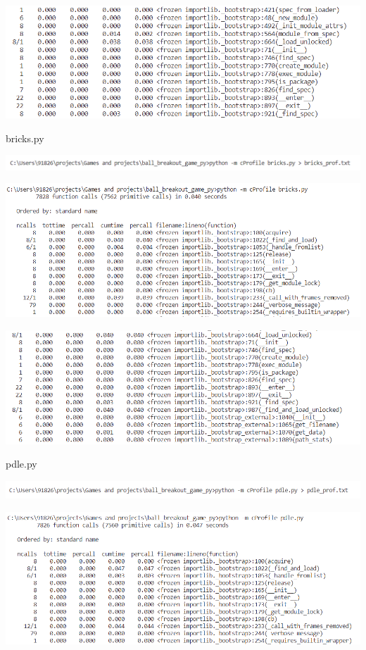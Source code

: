\documentclass{article}
\begin{document}
\begin{center}{\centering\includegraphics[scale=0.70]{python_ball_prof_02}}\end{center}
bricks.py
\begin{center}{\centering\includegraphics[scale=0.75]{python_bricks_prof_00}}\end{center}
\begin{center}{\centering\includegraphics[scale=0.70]{python_bricks_prof_01}}\end{center}
\begin{center}{\centering\includegraphics[scale=0.70]{python_bricks_prof_02}}\end{center}
pdle.py
\begin{center}{\centering\includegraphics[scale=0.75]{python_pdle_prof_00}}\end{center}
\begin{center}{\centering\includegraphics[scale=0.70]{python_pdle_prof_01}}\end{center}
\end{document}
